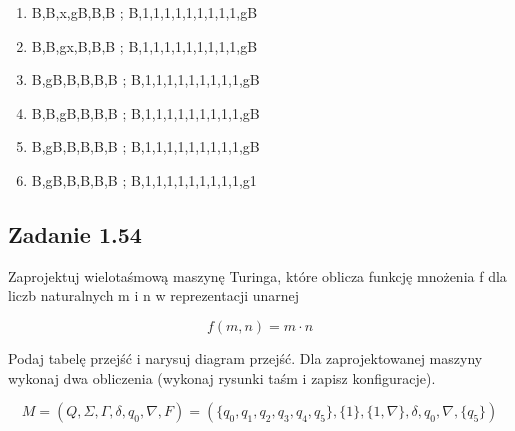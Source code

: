 \documentclass[leqno]{article}
\begin{document}
\begin{enumerate}
                    \item {}  {B,B,x,gB,B,B ; B,1,1,1,1,1,1,1,1,1,gB}
                    \item {}   {B,B,gx,B,B,B ; B,1,1,1,1,1,1,1,1,1,gB}
                    \item {}   {B,gB,B,B,B,B ; B,1,1,1,1,1,1,1,1,1,gB}
                    \item {}   {B,B,gB,B,B,B ; B,1,1,1,1,1,1,1,1,1,gB}
                    \item {}   {B,gB,B,B,B,B ; B,1,1,1,1,1,1,1,1,1,gB}
                    \item {}   {B,gB,B,B,B,B ; B,1,1,1,1,1,1,1,1,1,g1}
                \end{enumerate}

        \newpage
        \subsection{Zadanie 1.54}

            Zaprojektuj wielotaśmową maszynę Turinga, które oblicza funkcję
            mnożenia f dla liczb naturalnych m i n w reprezentacji unarnej
            
            \begin{equation}
                f(m, n) = m \cdot n
            \end{equation}

            Podaj tabelę przejść i narysuj diagram przejść. Dla zaprojektowanej maszyny
            wykonaj dwa obliczenia (wykonaj rysunki taśm i zapisz konfiguracje).
            
            \begin{equation}
                    M = (Q, \Sigma, \Gamma, \delta, q_0, \nabla, F) = (
                        \{q_0, q_1, q_2, q_3, q_4, q_5\}, 
                        \{1\}, 
                        \{1, \nabla\}, 
                        \delta, 
                        q_0, 
                        \nabla, 
                        \{q_5\}
                    )
            \end{equation}
\end{document}
